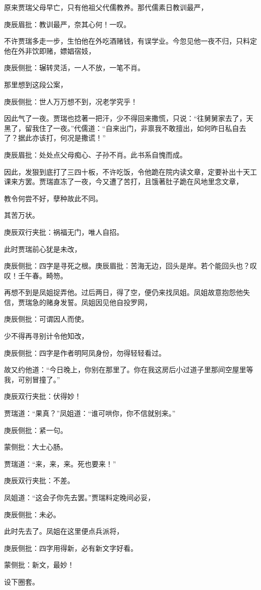 \begin{parag}
    原来贾瑞父母早亡，只有他祖父代儒教养。那代儒素日教训最严，\begin{note}庚辰眉批：教训最严，奈其心何！一叹。\end{note}不许贾瑞多走一步，生怕他在外吃酒赌钱，有误学业。今忽见他一夜不归，只料定他在外非饮即赌，嫖娼宿妓，\begin{note}庚辰侧批：辗转灵活，一人不放，一笔不肖。\end{note}那里想到这段公案，\begin{note}庚辰侧批：世人万万想不到，况老学究乎！\end{note}因此气了一夜。贾瑞也捻著一把汗，少不得回来撒慌，只说：“往舅舅家去了，天黑了，留我住了一夜。”代儒道：“自来出门，非禀我不敢擅出，如何昨日私自去了？据此亦该打，何况是撒谎！”\begin{note}庚辰眉批：处处点父母痴心、子孙不肖。此书系自愧而成。\end{note}因此，发狠到底打了三四十板，不许吃饭，令他跪在院内读文章，定要补出十天工课来方罢。贾瑞直冻了一夜，今又遭了苦打，且饿著肚子跪在风地里念文章，\begin{note}教令何尝不好，孽种故此不同。\end{note}其苦万状。\begin{note}庚辰双行夹批：祸福无门，唯人自招。\end{note}
\end{parag}


\begin{parag}
    此时贾瑞前心犹是未改，\begin{note}庚辰侧批：四字是寻死之根。庚辰眉批：苦海无边，回头是岸。若个能回头也？叹叹！壬午春。畸笏。\end{note}再想不到是凤姐捉弄他。过后两日，得了空，便仍来找凤姐。凤姐故意抱怨他失信，贾瑞急的赌身发誓。凤姐因见他自投罗网，\begin{note}庚辰侧批：可谓因人而使。\end{note}少不得再寻别计令他知改，\begin{note}庚辰侧批：四字是作者明阿凤身份，勿得轻轻看过。\end{note}故又约他道：“今日晚上，你别在那里了。你在我这房后小过道子里那间空屋里等我，可别冒撞了。”\begin{note}庚辰双行夹批：伏得妙！\end{note}贾瑞道：“果真？”凤姐道：“谁可哄你，你不信就别来。”\begin{note}庚辰侧批：紧一句。\end{note}\begin{note}蒙侧批：大士心肠。\end{note}贾瑞道：“来，来，来。死也要来！”\begin{note}庚辰双行夹批：不差。\end{note}凤姐道：“这会子你先去罢。”贾瑞料定晚间必妥，\begin{note}庚辰侧批：未必。\end{note}此时先去了。凤姐在这里便点兵派将，\begin{note}庚辰侧批：四字用得新，必有新文字好看。\end{note}\begin{note}蒙侧批：新文，最妙！\end{note}设下圈套。
\end{parag}


